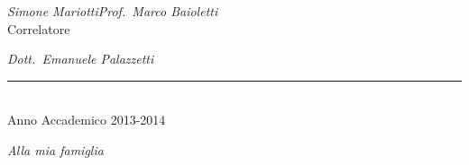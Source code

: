 \documentclass[a4paper,12pt]{report}
\def\laureando{Simone Mariotti}       %
\def\annoaccademico{2013-2014}    %
\def\dedica{Alla mia famiglia}      %
\newlength\corpo
\begin{document}
\begin{titlepage}
\hspace{0.0cm}\emph{\laureando}\hfill\emph{Prof.~Marco Baioletti}\\

\hspace*{9.5cm}Correlatore\par
\hspace*{3.0cm}\hfill\emph{Dott.~Emanuele Palazzetti}\\
\begin{center}
\vspace*{-3mm}

\rule{40mm}{0.01mm}\\

Anno Accademico \annoaccademico

\end{center}

\end{titlepage}

\newpage
\thispagestyle{empty}
\vspace*{2.5cm}
\begin{flushright}
\begin{Large}\emph{\dedica}\end{Large}
\end{flushright}
\frenchspacing
%

\thispagestyle{empty}
\tableofcontents



\fancyhf{}
\pagestyle{fancy}


\newpage
{}








\end{document}

